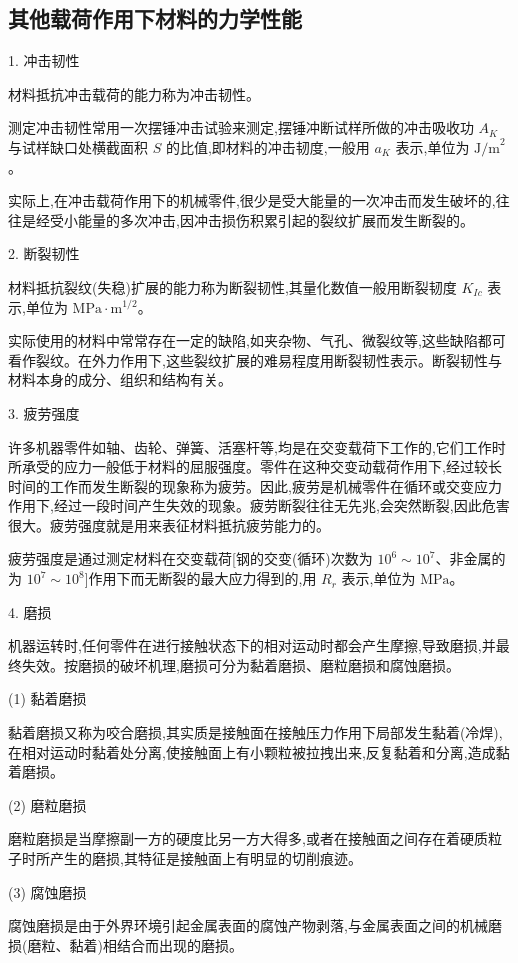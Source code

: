 \documentclass[UTF8]{ctexbook}
\newcommand{\◎}{\ensuremath{\bigcirc}}
\begin{document}
\subsection{其他载荷作用下材料的力学性能}

1. 冲击韧性

材料抵抗冲击载荷的能力称为冲击韧性。

测定冲击韧性常用一次摆锤冲击试验来测定,摆锤冲断试样所做的冲击吸收功 $A_K$ 与试样缺口处横截面积 $S$ 的比值,即材料的冲击韧度,一般用 $a_K$ 表示,单位为 $\text{J/m}^2$。

实际上,在冲击载荷作用下的机械零件,很少是受大能量的一次冲击而发生破坏的,往往是经受小能量的多次冲击,因冲击损伤积累引起的裂纹扩展而发生断裂的。

2. 断裂韧性

材料抵抗裂纹(失稳)扩展的能力称为断裂韧性,其量化数值一般用断裂韧度 $K_{Ic}$ 表示,单位为 $\text{MPa} \cdot \text{m}^{1/2}$。

实际使用的材料中常常存在一定的缺陷,如夹杂物、气孔、微裂纹等,这些缺陷都可看作裂纹。在外力作用下,这些裂纹扩展的难易程度用断裂韧性表示。断裂韧性与材料本身的成分、组织和结构有关。

3. 疲劳强度

许多机器零件如轴、齿轮、弹簧、活塞杆等,均是在交变载荷下工作的,它们工作时所承受的应力一般低于材料的屈服强度。零件在这种交变动载荷作用下,经过较长时间的工作而发生断裂的现象称为疲劳。因此,疲劳是机械零件在循环或交变应力作用下,经过一段时间产生失效的现象。疲劳断裂往往无先兆,会突然断裂,因此危害很大。疲劳强度就是用来表征材料抵抗疲劳能力的。

疲劳强度是通过测定材料在交变载荷[钢的交变(循环)次数为 $10^6 \sim 10^7$、非金属的为 $10^7 \sim 10^8$]作用下而无断裂的最大应力得到的,用 $R_r$ 表示,单位为 $\text{MPa}$。

4. 磨损

机器运转时,任何零件在进行接触状态下的相对运动时都会产生摩擦,导致磨损,并最终失效。按磨损的破坏机理,磨损可分为黏着磨损、磨粒磨损和腐蚀磨损。

(1) 黏着磨损

黏着磨损又称为咬合磨损,其实质是接触面在接触压力作用下局部发生黏着(冷焊),在相对运动时黏着处分离,使接触面上有小颗粒被拉拽出来,反复黏着和分离,造成黏着磨损。

(2) 磨粒磨损

磨粒磨损是当摩擦副一方的硬度比另一方大得多,或者在接触面之间存在着硬质粒子时所产生的磨损,其特征是接触面上有明显的切削痕迹。

(3) 腐蚀磨损

腐蚀磨损是由于外界环境引起金属表面的腐蚀产物剥落,与金属表面之间的机械磨损(磨粒、黏着)相结合而出现的磨损。
\end{document}
